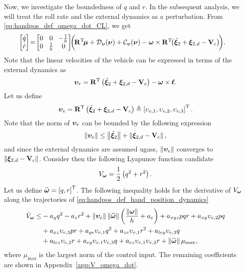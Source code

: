 Now, we investigate the boundedness of $q$ and $r$.
In the subsequent analysis, we will treat the roll rate and the external dynamics as a perturbation.
From \eqref{eq:handpos_def_omega_dot_CL}, we get
\begin{align}
    \begin{bmatrix}
        \dot{q} \\ \dot{r}
    \end{bmatrix}
    \!=\!
    \begin{bmatrix}
        0 & \!0\! & \!-\frac{1}{h} \\ 0 & \!\frac{1}{h}\! & 0
    \end{bmatrix} \!\!
    \bigg(\!&\mat{R}\T\!\bs{\mu} + \mathcal{D}_{\bvel}(\vel) + \mathcal{C}_{\bvel}(\vel)  - \bs{\omega} \times \mat{R}\T\!\!\left(\tilde{\bs{\xi}}_2 + \bs{\xi}_{2, d} - \ocean\right)\!\!\bigg).
    \label{eq:handpos_def_qr_dot}
\end{align}
Note that the linear velocities of the vehicle can be expressed in terms of the external dynamics as
\begin{equation}
    \bm{\upsilon}_r = \mathbf{R}^{\mathrm{T}} \left(\tilde{\bm{\xi}}_2 + \bm{\xi}_{2, d} - \mathbf{V}_c\right) - \bm{\omega} \times \boldsymbol{\ell}. \label{eq:handpos_def_nu_r_transformed}
\end{equation}
Let us define
\begin{equation}
    \bm{\upsilon}_e = \mathbf{R}^{\mathrm{T}} \left(\tilde{\bm{\xi}}_2 + \bm{\xi}_{2, d} - \mathbf{V}_c\right) \triangleq \left[\upsilon_{e, 1}, \upsilon_{e, 2}, \upsilon_{e, 3}\right]^{\mathrm{T}}.
\end{equation}
Note that the norm of $\bm{\upsilon}_e$ can be bounded by the following expression
\begin{equation}
    \left\|\bm{\upsilon}_e\right\| \leq \left\|\tilde{\bm{\xi}}_2\right\| + \left\|\bm{\xi}_{2, d} - \mathbf{V}_c\right\|,
\end{equation}
and since the external dynamics are assumed \glspl{ugas}, $\left\|\bm{\upsilon}_e\right\|$ converges to $\left\|\bm{\xi}_{2, d} - \mathbf{V}_c\right\|$.
Consider then the following Lyapunov function candidate
\begin{equation}
    V_{\bm{\omega}} = \frac{1}{2} \left(q^2 + r^2\right).
    \label{eq:handpos_def_V_omega}
\end{equation}
Let us define $\widehat{\bm{\omega}} = \left[q, r\right]^{\mathrm{T}}$.
The following inequality holds for the derivative of $V_{\bm{\omega}}$ along the trajectories of \eqref{eq:handpos_def_hand_position_dynamics}
\begin{align}
    \dot{V}_{\bm{\omega}} \leq& -a_yq^2 - a_zr^2 + \left\|\bm{\upsilon}_e\right\|\left\|\widehat{\bm{\omega}}\right\|\left(\frac{\left\|\bm{\omega}\right\|}{h} + a_e\right) + a_{xyz}pqr + a_{xy}\upsilon_{e, 2}pq \label{eq:handpos_def_V_omega_dot}\\
    & + a_{xz}\upsilon_{e, 3}pr + a_{ye}\upsilon_{e, 1}q^2 + a_{ze}\upsilon_{e, 1}r^2 + a_{ley}\upsilon_{e, 3}q \nonumber \\
    & + a_{lez}\upsilon_{e, 2}r + a_{ey}\upsilon_{e, 1}\upsilon_{e, 3}q + a_{ez}\upsilon_{e, 1}\upsilon_{e, 2}r + \left\|\widehat{\bm{\omega}}\right\|\mu_{\max}, \nonumber
\end{align}
where $\mu_{\max}$ is the largest norm of the control input.
The remaining coefficients are shown in Appendix~\ref{app:V_omega_dot}.

